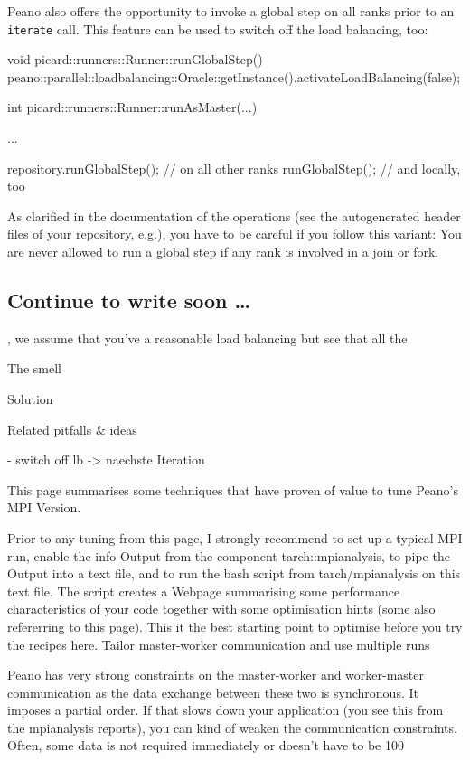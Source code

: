 Peano also offers the opportunity to invoke a
global step on all ranks prior to an \texttt{iterate} call.
This feature can be used to switch off the load balancing, too:

\begin{code}
void picard::runners::Runner::runGlobalStep() {
  peano::parallel::loadbalancing::Oracle::getInstance().activateLoadBalancing(false);
}


int picard::runners::Runner::runAsMaster(...) {
  ...
  
  repository.runGlobalStep(); // on all other ranks
  runGlobalStep();            // and locally, too
}
\end{code}

\noindent
As clarified in the documentation of the operations (see the autogenerated
header files of your repository, e.g.), you have to be careful if you follow
this variant:
You are never allowed to run a global step if any rank is involved in a join or
fork. 


\subsection{Continue to write soon \ldots}
, we assume that you've a reasonable load balancing but see that all
the
  
  The smell
  
  Solution
  
  Related pitfalls \& ideas
  
  - switch off lb -> naechste Iteration
  
  
  
This page summarises some techniques that have proven of value to tune Peano's MPI Version.

Prior to any tuning from this page, I strongly recommend to set up a typical MPI run, enable the info Output from the component tarch::mpianalysis, to pipe the Output into a text file, and to run the bash script from tarch/mpianalysis on this text file. The script creates a Webpage summarising some performance characteristics of your code together with some optimisation hints (some also refererring to this page). This it the best starting point to optimise before you try the recipes here.
Tailor master-worker communication and use multiple runs

Peano has very strong constraints on the master-worker and worker-master communication as the data exchange between these two is synchronous. It imposes a partial order. If that slows down your application (you see this from the mpianalysis reports), you can kind of weaken the communication constraints. Often, some data is not required immediately or doesn't have to be 100%

